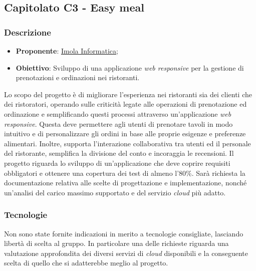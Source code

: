 \subsection{Capitolato C3 - Easy meal}


\subsubsection{Descrizione}
\begin{itemize}
    \item \textbf{Proponente}: \href{https://imolainformatica.it/}{Imola Informatica};
    \item \textbf{Obiettivo}: Sviluppo di una applicazione \textit{web responsive} per la gestione di prenotazioni e ordinazioni nei ristoranti.
\end{itemize}
Lo scopo del progetto è di migliorare l'esperienza nei ristoranti sia dei clienti che dei ristoratori, operando sulle criticità legate alle operazioni di prenotazione ed ordinazione e semplificando questi processi attraverso un'applicazione \textit{web responsive}. 
Questa deve permettere agli utenti di prenotare tavoli in modo intuitivo e di personalizzare gli ordini in base alle proprie esigenze e preferenze alimentari. 
Inoltre, supporta l'interazione collaborativa tra utenti ed il personale del ristorante, semplifica la divisione del conto e incoraggia le recensioni. 
Il progetto riguarda lo sviluppo di un'applicazione che deve coprire requisiti obbligatori e ottenere una copertura dei test di almeno l'80\%. 
Sarà richiesta la documentazione relativa alle scelte di progettazione e implementazione, nonché un'analisi del carico massimo supportato e del servizio \textit{cloud} più adatto.

\subsubsection{Tecnologie}
Non sono state fornite indicazioni in merito a tecnologie consigliate, lasciando libertà di scelta al gruppo. 
In particolare una delle richieste riguarda una valutazione approfondita dei diversi servizi di \textit{cloud} disponibili e la conseguente scelta di quello che si adatterebbe meglio al progetto.



